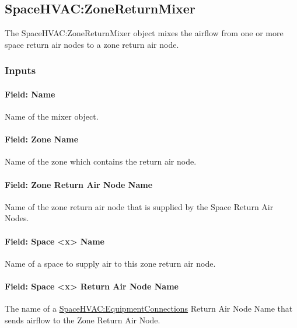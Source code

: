 \subsection{SpaceHVAC:ZoneReturnMixer}\label{spacehvaczonereturnmixer}

The SpaceHVAC:ZoneReturnMixer object mixes the airflow from one or more space return air nodes to a zone return air node.

\subsubsection{Inputs}\label{inputs-1-052-sretmixer}

\paragraph{Field: Name}\label{field-sretmixer-name-015}

Name of the mixer object.

\paragraph{Field: Zone Name}\label{field-sretmixer-zone-name}

Name of the zone which contains the return air node.

\paragraph{Field: Zone Return Air Node Name}\label{field-sretmixer-zone-return-air-node-name}

Name of the zone return air node that is supplied by the Space Return Air Nodes.

\paragraph{Field: Space \textless{}x\textgreater{} Name}\label{field-sretmixer-space-name}

Name of a space to supply air to this zone return air node.

\paragraph{Field: Space \textless{}x\textgreater{} Return Air Node Name}\label{field-sretmixer-space-node-name}

The name of a \hyperref[spacehvacequipmentconnections]{SpaceHVAC:EquipmentConnections} Return Air Node Name that sends airflow to the Zone Return Air Node.

